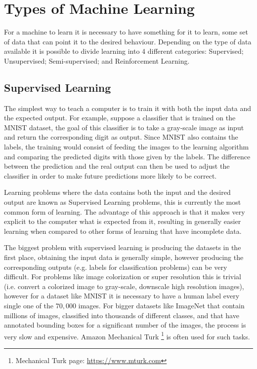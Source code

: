 \section{Types of Machine Learning}
For a machine to learn it is necessary to have something for it to learn, some set of data that can point it to the desired behaviour. Depending on the type of data available it is possible to divide learning into 4 different categories: Supervised; Unsupervised; Semi-supervised; and Reinforcement Learning.

\subsection{Supervised Learning} \label{sub:supervised_learning}
The simplest way to teach a computer is to train it with both the input data and the expected output. For example, suppose a classifier that is trained on the \gls{MNIST} dataset, the goal of this classifier is to take a gray-scale image as input and return the corresponding digit as output. Since \gls{MNIST} also contains the labels, the training would consist of feeding the images to the learning algorithm and comparing the predicted digits with those given by the labels. The difference between the prediction and the real output can then be used to adjust the classifier in order to make future predictions more likely to be correct.

Learning problems where the data contains both the input and the desired output are known as Supervised Learning problems, this is currently the most common form of learning. The advantage of this approach is that it makes very explicit to the computer what is expected from it, resulting in generally easier learning when compared to other forms of learning that have incomplete data.

The biggest problem with supervised learning is producing the datasets in the first place, obtaining the input data is generally simple, however producing the corresponding outputs (e.g. labels for classification problems) can be very difficult. For problems like image colorization \cite{colorization2016} or super resolution \cite{ganSuperResolution2016} this is trivial (i.e. convert a colorized image to gray-scale, downscale high resolution images), however for a dataset like \gls{MNIST} it is necessary to have a human label every single one of the $70,000$ images. For bigger datasets like ImageNet \cite{imageNet2015} that contain millions of images, classified into thousands of different classes, and that have annotated bounding boxes for a significant number of the images, the process is very slow and expensive. Amazon Mechanical Turk 
\footnote{
    Mechanical Turk page: \url{https://www.mturk.com}
}%
is often used for such tasks.

